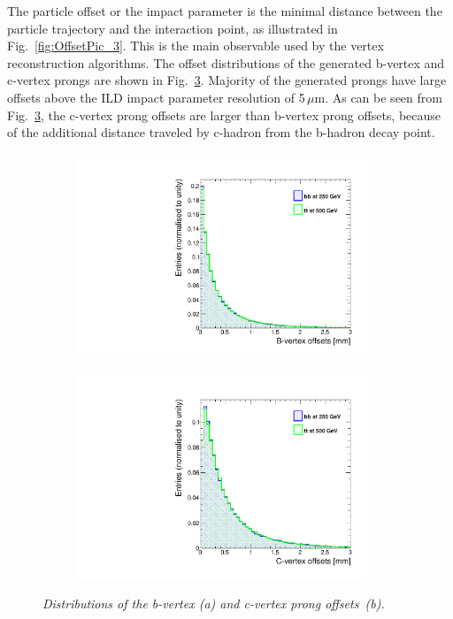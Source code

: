 The particle offset or the impact parameter is the minimal distance between the particle trajectory and the interaction point, as illustrated in Fig.~\ref{fig:OffsetPic_3}.
This is the main observable used by the vertex reconstruction algorithms. 
The offset distributions of the generated b-vertex and c-vertex prongs are shown in Fig.~\ref{fig:GenVtxOffset_3}.
Majority of the generated prongs have large offsets above the ILD impact parameter resolution of 5\,$\mu$m. 
As can be seen from Fig.~\ref{fig:GenVtxOffset_3}, the c-vertex prong offsets are larger than b-vertex prong offsets, because of the additional distance traveled by c-hadron from the b-hadron decay point. 

\begin{figure}[h]
\centering
\begin{subfigure}{0.5\textwidth}
    \includegraphics[width=0.95\textwidth]{ILD/plots/gen-bvtx-offsets.pdf}
\caption{\label{fig:GenVtxOffset_a_3} }
\end{subfigure}%
  \begin{subfigure}{0.5\textwidth}
\centering
    \includegraphics[width=0.95\textwidth]{ILD/plots/gen-cvtx-offsets.pdf}
\caption{\label{fig:GenVtxOffset_b_3} }
\end{subfigure}
    \caption{\sl Distributions of the b-vertex (a) and c-vertex prong offsets~(b). }
    \label{fig:GenVtxOffset_3}
\end{figure}

